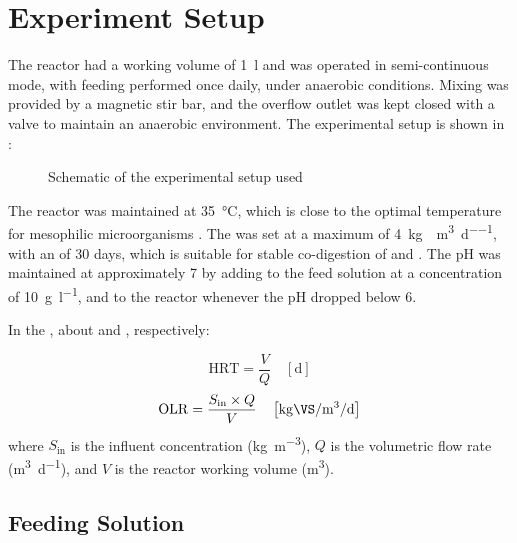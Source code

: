 \documentclass[12pt, a4paper, oneside]{report}
\begin{document}
\section{Experiment Setup}
\label{sec:experiment_configuration}

The reactor had a working volume of \qty{1}{\litre} and was operated in semi-continuous mode, with feeding performed once daily, under anaerobic conditions. Mixing was provided by a magnetic stir bar, and the overflow outlet was kept closed with a valve to maintain an anaerobic environment. The experimental setup is shown in :

\begin{figure}[H]
    \centering
    \resizebox{\textwidth}{!}{
    }
    \caption{Schematic of the experimental setup used}
    \label{graph:reactor}
\end{figure}

The reactor was maintained at \qty{35}{\celsius}, which is close to the optimal temperature for mesophilic microorganisms \parencite{choorit2007}. The  was set at a maximum of \qty{4}{\kilo\gram\VS\per\cubic\metre\per\day}, with an  of \num{30} days, which is suitable for stable co-digestion of  and  \parencite{tomczak2025}. The pH was maintained at approximately \num{7} by adding  to the feed solution at a concentration of \qty{10}{\gram\per\litre}, and to the reactor whenever the pH dropped below \num[round-mode = places, round-precision = 1]{6}.

In the , about  and , respectively:

\begin{equation}
    \mathrm{HRT} = \frac{V}{Q} \quad \left[\unit{\day}\right]
    \label{eq:HRT}
\end{equation}
\begin{equation}
    \mathrm{OLR} = \frac{S_{\text{in}} \times Q}{V} \quad \left[\unit{\kilo\gram\VS\per\cubic\meter\per\day}\right]
    \label{eq:OLR}
\end{equation}
where $S_{\text{in}}$ is the influent \unit{\VS} concentration (\unit{\kilo\gram\per\cubic\metre}), $Q$ is the volumetric flow rate (\unit{\cubic\metre\per\day}), and $V$ is the reactor working volume (\unit{\cubic\metre}).

\subsection{Feeding Solution}
\label{subsec:feeding_solution}
\end{document}
